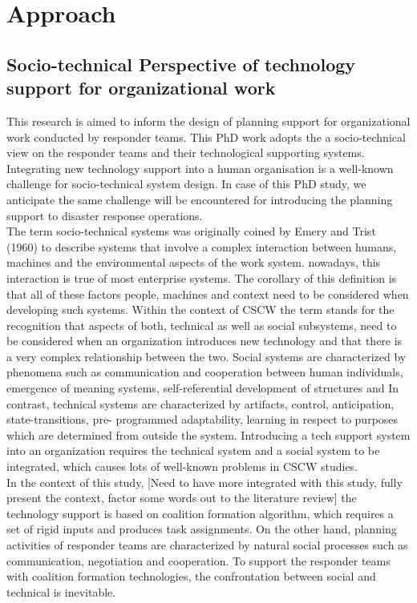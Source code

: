 \chapter{Approach}\label{ch:approach}


\section{Socio-technical Perspective of technology support for organizational work}\label{sec:sociotech}
This research is aimed to inform the design of planning support for organizational work conducted by responder teams. This PhD work adopts the a socio-technical view on the responder teams and their technological supporting systems. Integrating new technology support into a human organisation is a well-known challenge for socio-technical system design. In case of this PhD study, we anticipate the same challenge will be encountered for  introducing the planning support to disaster response operations.\\

The term socio-technical systems was originally coined by Emery and Trist (1960) to describe systems that involve a complex interaction between humans, machines and the environmental aspects of the work system. nowadays, this interaction is true of most enterprise systems. The corollary of this definition is that all of these factors  people, machines and context need to be considered when developing such systems. Within the context of CSCW the term stands for the recognition that aspects of both, technical as well as social subsystems, need to be considered when an organization introduces new technology and that there is a very complex relationship between the two. Social systems are characterized by phenomena such as communication and cooperation between human individuals, emergence of meaning systems, self-referential development of structures and In contrast, technical systems are characterized by artifacts, control, anticipation, state-transitions, pre- programmed adaptability, learning in respect to purposes which are determined from outside the system. Introducing a tech support system into an organization requires the technical system and a social system to be integrated, which causes lots of well-known problems in CSCW studies. \\

In the context of this study, [Need to have more integrated with this study, fully present the context, factor some words out to the literature review] the technology support is based on coalition formation algorithm, which requires a set of rigid inputs and produces task assignments. On the other hand, planning activities of responder teams are characterized by natural social processes such as communication, negotiation and cooperation. To support the responder teams with coalition formation technologies, the confrontation between social and technical is inevitable. \\


